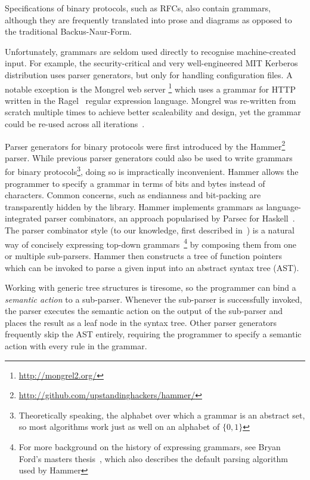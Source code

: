 Specifications of binary protocols, such as RFCs, also contain grammars, although they are
frequently translated into prose and diagrams as opposed to the traditional Backus-Naur-Form.  


Unfortunately, grammars are seldom used directly to recognise machine-created input. For example,
the security-critical and very well-engineered MIT Kerberos distribution uses parser
generators, but only for handling configuration files. A notable exception is the Mongrel
web server \footnote{\url{http://mongrel2.org/}} which uses a grammar for HTTP written in the
Ragel~\cite{ragel-paper} regular expression language. Mongrel was re-written from scratch multiple
times to achieve better scaleability and design, yet the grammar could be  re-used across all iterations~\cite{patterson-citation}.

 Parser generators for binary protocols were first introduced by the Hammer\footnote{\url{http://github.com/upstandinghackers/hammer/}} parser.
 While previous parser generators could also be used to write grammars for binary
 protocols\footnote{Theoretically speaking, the alphabet over which a grammar is an  abstract set,
   so most algorithms work just as well on an alphabet of $\{0,1\}$}, doing so is impractically
 inconvenient. Hammer allows the programmer to specify a grammar in terms of bits and bytes instead
 of characters. Common concerns, such as endianness and bit-packing are transparently hidden by the
 library. Hammer implements grammars as language-integrated parser combinators, an approach
 popularised by Parsec for Haskell~\cite{LeijenMeijer:parsec}. The parser combinator style (to our
 knowledge, first  described in~\cite{burge1975recursive}) is a natural way of concisely expressing
 top-down grammars~\cite{Danielsson:2010:TPC:1863543.1863585}\footnote{For more background on the history of expressing grammars, see Bryan
   Ford's masters thesis~\cite{ford2002packrat}, which also describes the default parsing algorithm used by Hammer} by composing them from one or multiple sub-parsers. 
  Hammer then constructs a tree of function pointers which
 can be invoked to parse a given input into an abstract syntax tree (AST).
 
Working with generic tree structures is tiresome, so the programmer can bind a \textit{semantic action} to a
sub-parser. Whenever the sub-parser is successfully invoked, the parser executes the semantic action
on the output of the sub-parser and places the result as a leaf node in the syntax tree. Other
parser generators frequently skip the AST entirely, requiring the programmer to specify a semantic
action with every rule in the grammar. 

